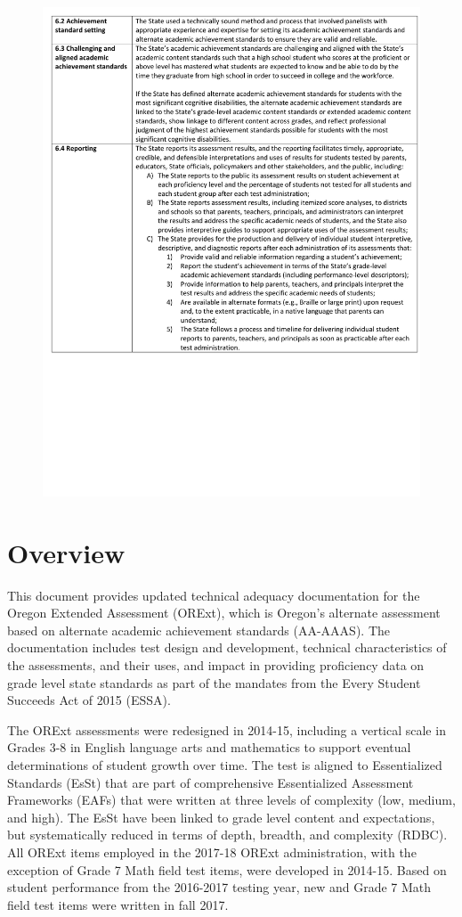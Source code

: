 \documentclass[]{article}
\begin{document}
\begin{figure}
\centering
\includegraphics{Figures/peer_rev/PeerReview6.pdf}
\caption{}
\end{figure}

\section{Overview}\label{overview}

This document provides updated technical adequacy documentation for the
Oregon Extended Assessment (ORExt), which is Oregon's alternate
assessment based on alternate academic achievement standards (AA-AAAS).
The documentation includes test design and development, technical
characteristics of the assessments, and their uses, and impact in
providing proficiency data on grade level state standards as part of the
mandates from the Every Student Succeeds Act of 2015 (ESSA).

The ORExt assessments were redesigned in 2014-15, including a vertical
scale in Grades 3-8 in English language arts and mathematics to support
eventual determinations of student growth over time. The test is aligned
to Essentialized Standards (EsSt) that are part of comprehensive
Essentialized Assessment Frameworks (EAFs) that were written at three
levels of complexity (low, medium, and high). The EsSt have been linked
to grade level content and expectations, but systematically reduced in
terms of depth, breadth, and complexity (RDBC). All ORExt items employed
in the 2017-18 ORExt administration, with the exception of Grade 7 Math
field test items, were developed in 2014-15. Based on student
performance from the 2016-2017 testing year, new and Grade 7 Math field
test items were written in fall 2017.
\end{document}
